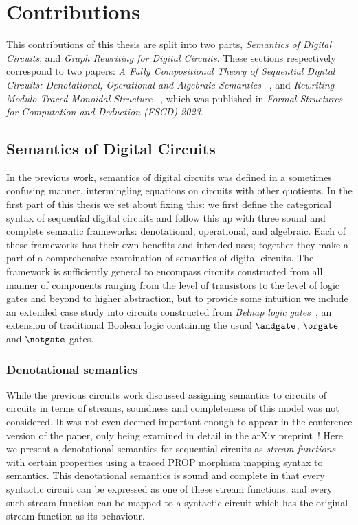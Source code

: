 \section{Contributions}

This contributions of this thesis are split into two parts,
\emph{Semantics of Digital Circuits}, and
\emph{Graph Rewriting for Digital Circuits}.
These sections respectively correspond to two papers:
\emph{%
    A Fully Compositional Theory of Sequential Digital Circuits:
    Denotational, Operational and Algebraic Semantics%
}~\cite{ghica2024fully}, and \emph{%
    Rewriting Modulo Traced Monoidal Structure%
}~\cite{ghica2023rewriting}, which was published in
\emph{Formal Structures for Computation and Deduction (FSCD) 2023}.

\subsection{Semantics of Digital Circuits}

In the previous work, semantics of digital circuits was defined in a sometimes
confusing manner, intermingling equations on circuits with other quotients.
In the first part of this thesis we set about fixing this: we first define the
categorical syntax of sequential digital circuits and follow this up with three
sound and complete semantic frameworks: denotational, operational, and
algebraic.
Each of these frameworks has their own benefits and intended uses; together they
make a part of a comprehensive examination of semantics of digital circuits.
The framework is sufficiently general to encompass circuits constructed from
all manner of components ranging from the level of transistors to the level of
logic gates and beyond to higher abstraction, but to provide some intuition we
include an extended case study into circuits constructed from
\emph{Belnap logic gates}~\cite{belnap1977useful}, an extension of traditional
Boolean logic containing the usual \(\andgate\), \(\orgate\) and \(\notgate\)
gates.

\subsubsection{Denotational semantics}

While the previous circuits work discussed assigning semantics to circuits
of circuits in terms of streams, soundness and completeness of this model was
not considered.
It was not even deemed important enough to appear in the conference version of
the paper, only being examined in detail in the arXiv
preprint~\cite{ghica2017diagrammatica}!
Here we present a denotational semantics for sequential circuits as
\emph{stream functions} with certain properties using a traced PROP morphism
mapping syntax to semantics.
This denotational semantics is sound and complete in that every syntactic
circuit can be expressed as one of these stream functions, and every such stream
function can be mapped to a syntactic circuit which has the original stream
function as its behaviour.

